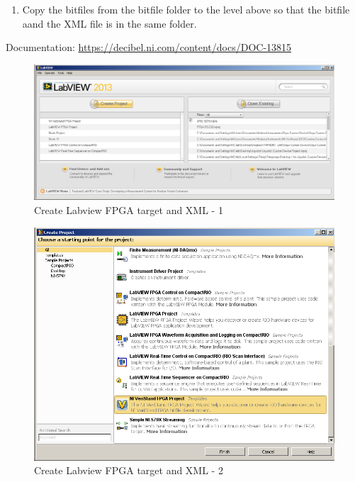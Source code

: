 \begin{enumerate}
	\item Copy the bitfiles from the bitfile folder to the level above so that the bitfile aand the XML file is in the same folder.
\end{enumerate}
Documentation: \url{https://decibel.ni.com/content/docs/DOC-13815}

\begin{figure}[htb!]
	\centering \includegraphics[scale=0.45]{Screenshots/Screenshot_2015-01-16_19-21-16.png}
	\caption{Create Labview FPGA target and XML - 1}
	\label{fig: Create Labview FPGA target and XML-1} 
\end{figure}
\begin{figure}[htb!]
	\centering \includegraphics[scale=0.45]{Screenshots/Screenshot_2015-01-16_19-23-23.png}
	\caption{Create Labview FPGA target and XML - 2}
	\label{fig: Create Labview FPGA target and XML-2} 
\end{figure}
